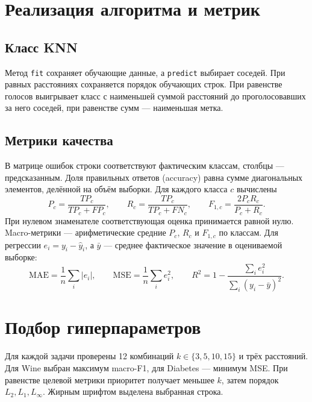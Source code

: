 \clearpage
\section{Реализация алгоритма и метрик}
\subsection{Класс KNN}

Метод \texttt{fit} сохраняет обучающие данные, а \texttt{predict} выбирает
соседей. При равных расстояниях сохраняется порядок обучающих строк.
При равенстве голосов выигрывает класс с наименьшей суммой расстояний
до проголосовавших за него соседей, при равенстве сумм --- наименьшая метка.


\clearpage
\subsection{Метрики качества}

В матрице ошибок строки соответствуют фактическим классам, столбцы ---
предсказанным. Доля правильных ответов (accuracy) равна сумме диагональных
элементов, делённой на объём выборки. Для каждого класса \(c\) вычислены
\[
 P_c=\frac{TP_c}{TP_c+FP_c},\qquad
 R_c=\frac{TP_c}{TP_c+FN_c},\qquad
 F_{1,c}=\frac{2P_cR_c}{P_c+R_c}.
\]
При нулевом знаменателе соответствующая оценка принимается равной нулю.
Macro-метрики --- арифметические средние \(P_c\), \(R_c\) и \(F_{1,c}\)
по классам. Для регрессии \(e_i=y_i-\hat y_i\), а \(\bar y\) ---
среднее фактическое значение в оцениваемой выборке:
\[
\mathrm{MAE}=\frac{1}{n}\sum_i|e_i|,\qquad
\mathrm{MSE}=\frac{1}{n}\sum_i e_i^2,\qquad
R^2=1-\frac{\sum_i e_i^2}{\sum_i(y_i-\bar y)^2}.
\]


\clearpage
\section{Подбор гиперпараметров}

Для каждой задачи проверены 12 комбинаций \(k\in\{3,5,10,15\}\) и трёх
расстояний. Для Wine выбран максимум macro-F1, для Diabetes --- минимум MSE.
При равенстве целевой метрики приоритет получает меньшее \(k\), затем
порядок \(L_2,L_1,L_\infty\). Жирным шрифтом выделена выбранная строка.

